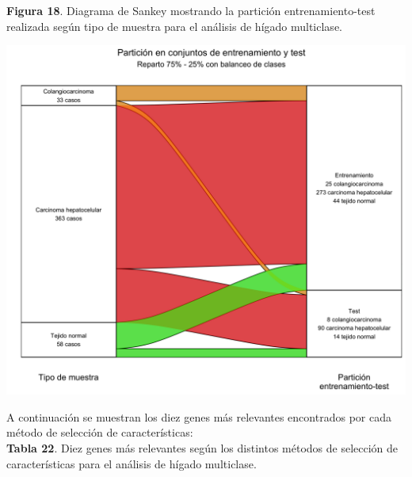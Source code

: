 \begin{center}
\textbf{Figura 18}. Diagrama de Sankey mostrando la partición entrenamiento-test realizada según tipo de muestra para el análisis de hígado multiclase.
\end{center}
\begin{center}
	\includegraphics[width=1\textwidth]{figuras/18_higado_multiclase_05_sankey.png}
\end{center}

A continuación se muestran los diez genes más relevantes encontrados por cada método de selección de características:\\

\textbf{Tabla 22}. Diez genes más relevantes según los distintos métodos de selección de características para el análisis de hígado multiclase.

